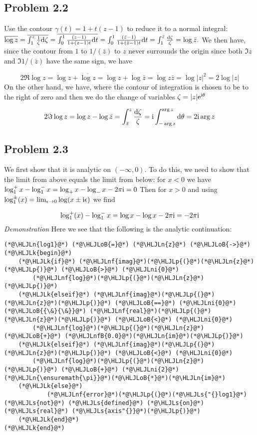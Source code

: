 \documentclass[12pt,landscape]{article}
\newcommand{\HLJLk}[1]{\textcolor[RGB]{148,91,176}{\textbf{#1}}}
\newcommand{\HLJLn}[1]{#1}
\newcommand{\HLJLnf}[1]{\textcolor[RGB]{66,102,213}{#1}}
\newcommand{\HLJLs}[1]{\textcolor[RGB]{201,61,57}{#1}}
\newcommand{\HLJLnfB}[1]{\textcolor[RGB]{59,151,46}{#1}}
\newcommand{\HLJLni}[1]{\textcolor[RGB]{59,151,46}{#1}}
\newcommand{\HLJLoB}[1]{\textcolor[RGB]{102,102,102}{\textbf{#1}}}
\newcommand{\HLJLp}[1]{#1}
\def\D{ {\rm d} }
\def\I{ {\rm i} }
\def\E{ {\rm e} }
\def\dt{\D t}
\begin{document}
{\subsection{Problem 2.2}
Use the contour $\gamma(t) = 1 + t(z-1)$ to reduce it to a normal integral: $\overline{\log z } = \overline{\int_1^z {1 \over \zeta} \D \zeta} = \overline{\int_0^1 {(z-1) \over 1+(z-1) t} \dt}  = \int_0^1 {(\bar z-1) \over 1+(\bar z-1) t} \dt = \int_1^{\bar z} {\D \zeta \over \zeta} = \log \bar z.$ We then have, since the contour from $1$ to $1/(\bar z)$ to $z$ never surrounds the origin since both $\Im z$ and $\Im 1/(\bar z)$ have the same sign, we have

\[
2 \Re \log z = \log z + \overline{\log z} = \log z + \log \bar z = \log z \bar z = \log |z|^2 = 2 \log |z|
\]
On the other hand, we have, where the contour of integration is chosen to be to the right of zero and then we do the change of variables $\zeta = |z| \E^{\I \theta}$

\[
2 \Im \log z = \log z - \log \bar z = \int_{\bar z}^z {\D \zeta \over \zeta} = \I \int_{-\arg z}^{\arg z} \D \theta = 2 \I \arg z
\]
\subsection{Problem 2.3}
We first show that it is analytic on $(-\infty,0)$. To do this, we need to show that the limit from above equals the limit from below: for $x < 0$ we have $\log_1^+ x -\log_1^- x = \log_+x - \log_- x -2 \pi \I = 0$ Then for $x > 0$ and using $\log_1^\pm(x) = \lim_{\epsilon\rightarrow 0} \log(x\pm \I \epsilon)$ we find

\[
\log_1^+(x) - \log_1^-x = \log x- \log x- 2\pi \I = -2 \pi \I
\]
\emph{Demonstration} Here we see that the following is the analytic continuation:


\begin{lstlisting}
(*@\HLJLn{log1}@*) (*@\HLJLoB{=}@*) (*@\HLJLn{z}@*) (*@\HLJLoB{->}@*) (*@\HLJLk{begin}@*)
    (*@\HLJLk{if}@*) (*@\HLJLnf{imag}@*)(*@\HLJLp{(}@*)(*@\HLJLn{z}@*)(*@\HLJLp{)}@*) (*@\HLJLoB{>}@*) (*@\HLJLni{0}@*)
        (*@\HLJLnf{log}@*)(*@\HLJLp{(}@*)(*@\HLJLn{z}@*)(*@\HLJLp{)}@*)
    (*@\HLJLk{elseif}@*) (*@\HLJLnf{imag}@*)(*@\HLJLp{(}@*)(*@\HLJLn{z}@*)(*@\HLJLp{)}@*) (*@\HLJLoB{==}@*) (*@\HLJLni{0}@*) (*@\HLJLoB{{\&}{\&}}@*) (*@\HLJLnf{real}@*)(*@\HLJLp{(}@*)(*@\HLJLn{z}@*)(*@\HLJLp{)}@*) (*@\HLJLoB{<}@*) (*@\HLJLni{0}@*)
        (*@\HLJLnf{log}@*)(*@\HLJLp{(}@*)(*@\HLJLn{z}@*) (*@\HLJLoB{+}@*) (*@\HLJLnfB{0.0}@*)(*@\HLJLn{im}@*)(*@\HLJLp{)}@*)
    (*@\HLJLk{elseif}@*) (*@\HLJLnf{imag}@*)(*@\HLJLp{(}@*)(*@\HLJLn{z}@*)(*@\HLJLp{)}@*) (*@\HLJLoB{<}@*) (*@\HLJLni{0}@*)
        (*@\HLJLnf{log}@*)(*@\HLJLp{(}@*)(*@\HLJLn{z}@*)(*@\HLJLp{)}@*) (*@\HLJLoB{+}@*) (*@\HLJLni{2}@*)(*@\HLJLn{\ensuremath{\pi}}@*)(*@\HLJLoB{*}@*)(*@\HLJLn{im}@*)
    (*@\HLJLk{else}@*)
            (*@\HLJLnf{error}@*)(*@\HLJLp{(}@*)(*@\HLJLs{"{}log1}@*) (*@\HLJLs{not}@*) (*@\HLJLs{defined}@*) (*@\HLJLs{on}@*) (*@\HLJLs{real}@*) (*@\HLJLs{axis"{}}@*)(*@\HLJLp{)}@*)
    (*@\HLJLk{end}@*)
(*@\HLJLk{end}@*)


\end{lstlisting}}
\end{document}
